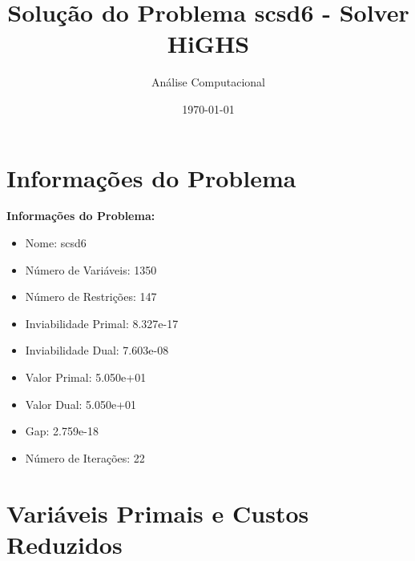 \documentclass[12pt]{article}
\title{Solução do Problema scsd6 - Solver HiGHS}
\author{Análise Computacional}
\date{\today}
\begin{document}
\maketitle

\section{Informações do Problema}

\textbf{Informações do Problema:}
\begin{itemize}
\item Nome: scsd6
\item Número de Variáveis: 1350
\item Número de Restrições: 147
\item Inviabilidade Primal: 8.327e-17
\item Inviabilidade Dual: 7.603e-08
\item Valor Primal: 5.050e+01
\item Valor Dual: 5.050e+01
\item Gap: 2.759e-18
\item Número de Iterações: 22
\end{itemize}


\section{Variáveis Primais e Custos Reduzidos}
\end{document}
